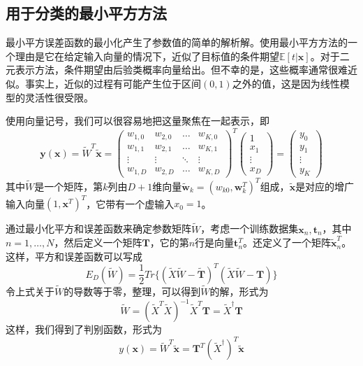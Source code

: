 \subsection*{用于分类的最小平方方法}
最小平方误差函数的最小化产生了参数值的简单的解析解。使用最小平方方法的一个理由是它在给定输入向量的情况下，近似了目标值的条件期望$\mathbb{E}[t|\boldsymbol{x}]$。对于二元表示方法，条件期望由后验类概率向量给出。但不幸的是，这些概率通常很难近似。事实上，近似的过程有可能产生位于区间$(0,1)$之外的值，这是因为线性模型的灵活性很受限。

使用向量记号，我们可以很容易地把这量聚焦在一起表示，即
\begin{equation}
	\boldsymbol{y}(\boldsymbol{x})=\tilde{W}^T\tilde{\boldsymbol{x}}
	=
	\begin{pmatrix}
	w_{1,0}& w_{2,0}& \dots& w_{K,0}\\
	w_{1,1}& w_{2,1}& \dots& w_{K,1}\\
	\vdots& \vdots & \ddots& \vdots\\
	w_{1,D}& w_{2,D}& \dots& w_{K,D}
	\end{pmatrix}^T
	\begin{pmatrix}
	1\\x_1\\\vdots\\x_{D}
	\end{pmatrix}
	=
	\begin{pmatrix}
	y_0\\y_1\\\vdots \\y_{K}
	\end{pmatrix}
\end{equation}
其中$\tilde{W}$是一个矩阵，第$k$列由$D+1$维向量$\tilde{\boldsymbol{w}}_k=(w_{k0},\boldsymbol{w}_k^T)^T$组成，$\tilde{\boldsymbol{x}}$是对应的增广输入向量$(1,\boldsymbol{x}^T)^T$，它带有一个虚输入$x_0=1$。

通过最小化平方和误差函数来确定参数矩阵$\tilde{W}$，考虑一个训练数据集$\boldsymbol{x}_n,\boldsymbol{t}_n$，其中$n=1,\dots,N$，然后定义一个矩阵$\boldsymbol{T}$，它的第$n$行是向量$\boldsymbol{t}_n^T$。还定义了一个矩阵$\tilde{\boldsymbol{x}}_n^T$。这样，平方和误差函数可以写成
\begin{equation}
	E_D(\tilde{W})=\frac{1}{2}Tr\{(\tilde{X}\tilde{W}-\tilde{\boldsymbol{T}})^T(\tilde{X}\tilde{W}-\boldsymbol{T}) \}
\end{equation}
令上式关于$\tilde{W}$的导数等于零，整理，可以得到$\tilde{W}$的解，形式为
\begin{equation}
	\tilde{W}=(\tilde{X}^T\tilde{X})^{-1}\tilde{X}^T\boldsymbol{T}=\tilde{X}^{\dag}\boldsymbol{T}
\end{equation}
这样，我们得到了判别函数，形式为
\begin{equation}
	y(\boldsymbol{x})=\tilde{W}^T\tilde{\boldsymbol{x}}=\boldsymbol{T}^T(\tilde{X}^{\dag})^T\tilde{\boldsymbol{x}}
\end{equation}


